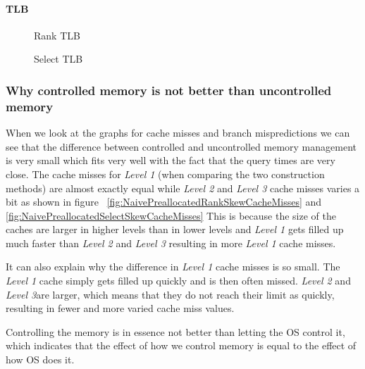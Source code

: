 \paragraph{TLB}

\begin{figure}
\caption{Rank TLB}
\label{fig:NaiveVsPreallocatedSkewRankQueryTLB}

\end{figure}

\begin{figure}
\caption{Select TLB}
\label{fig:NaiveVsPreallocatedSkewSelectQueryTLB}

\end{figure}



\subsubsection{Why controlled memory is not better than uncontrolled memory}
When we look at the graphs for cache misses and branch mispredictions we can see that the difference between controlled and uncontrolled memory management is very small which fits very well with the fact that the query times are very close.
The cache misses for \textit{Level 1} (when comparing the two construction methods) are almost exactly equal while \textit{Level 2} and \textit{Level 3} cache misses varies a bit as shown in figure ~\ref{fig:NaivePreallocatedRankSkewCacheMisses} and \ref{fig:NaivePreallocatedSelectSkewCacheMisses}
This is because the size of the caches are larger in higher levels than in lower levels and \textit{Level 1} gets filled up much faster than \textit{Level 2} and \textit{Level 3} resulting in more \textit{Level 1} cache misses.

It can also explain why the difference in \textit{Level 1} cache misses is so small. 
The \textit{Level 1} cache simply gets filled up quickly and is then often missed. \textit{Level 2} and \textit{Level 3}are larger, which means that they do not reach their limit as quickly, resulting in fewer and more varied cache miss values.



Controlling the memory is in essence not better than letting the OS control it, which indicates that the effect of how we control memory is equal to the effect of how OS does it.







